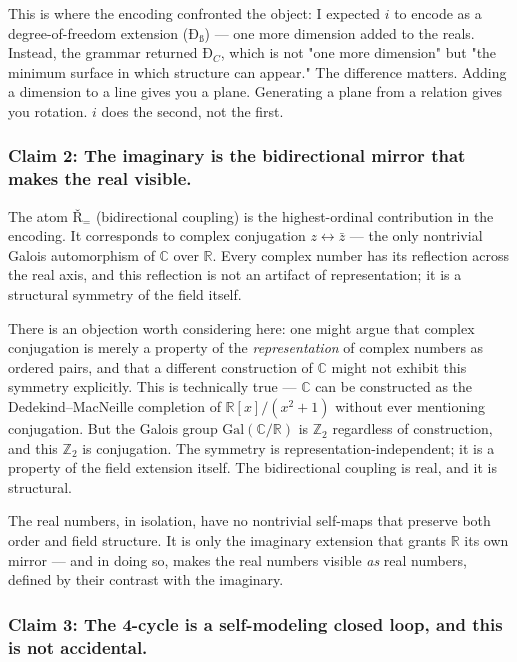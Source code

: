 \documentclass[12pt,a4paper]{article}
\begin{document}
This is where the encoding confronted the object: I expected $i$ to encode as a degree-of-freedom extension ($Ð_{ß}$) --- one more dimension added to the reals. Instead, the grammar returned $Ð_{C}$, which is not "one more dimension" but "the minimum surface in which structure can appear." The difference matters. Adding a dimension to a line gives you a plane. Generating a plane from a relation gives you rotation. $i$ does the second, not the first.

\subsubsection{Claim 2: The imaginary is the bidirectional mirror that makes the real visible.}

The atom $Ř_{=}$ (bidirectional coupling) is the highest-ordinal contribution in the encoding. It corresponds to complex conjugation $z \leftrightarrow \bar{z}$ --- the only nontrivial Galois automorphism of $\mathbb{C}$ over $\mathbb{R}$. Every complex number has its reflection across the real axis, and this reflection is not an artifact of representation; it is a structural symmetry of the field itself.

There is an objection worth considering here: one might argue that complex conjugation is merely a property of the \emph{representation} of complex numbers as ordered pairs, and that a different construction of $\mathbb{C}$ might not exhibit this symmetry explicitly. This is technically true --- $\mathbb{C}$ can be constructed as the Dedekind--MacNeille completion of $\mathbb{R}[x]/(x^2+1)$ without ever mentioning conjugation. But the Galois group $\text{Gal}(\mathbb{C}/\mathbb{R})$ is $\mathbb{Z}_2$ regardless of construction, and this $\mathbb{Z}_2$ is conjugation. The symmetry is representation-independent; it is a property of the field extension itself. The bidirectional coupling is real, and it is structural.

The real numbers, in isolation, have no nontrivial self-maps that preserve both order and field structure. It is only the imaginary extension that grants $\mathbb{R}$ its own mirror --- and in doing so, makes the real numbers visible \emph{as} real numbers, defined by their contrast with the imaginary.

\subsubsection{Claim 3: The 4-cycle is a self-modeling closed loop, and this is not accidental.}
\end{document}
